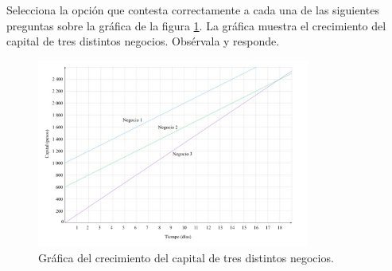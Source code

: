 Selecciona la opci\'on que contesta correctamente
a cada una de las siguientes preguntas sobre la gr\'afica de la figura \ref{fig:SINMAT1_U3_AC76_IMG1}.
La gráfica muestra el crecimiento del capital de tres distintos negocios. Obsérvala y responde.
\begin{figure}[H]
    \centering
    \includegraphics[width=0.8\textwidth]{../images/SINMAT1_U3_AC76_IMG1}
    \caption{Gr\'afica del crecimiento del capital de tres distintos negocios.}
    \label{fig:SINMAT1_U3_AC76_IMG1}
\end{figure}
\begin{parts}
    
    
    
    
    
\end{parts}